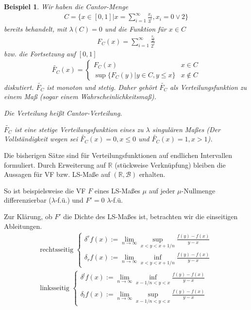 \documentclass[]{article}
\newtheorem*{example}{Beispiel}
\begin{document}
\begin{example}
	Wir haben die Cantor-Menge
	\begin{align*}
		C = \{ x \in [0,1] | x = \sum_{i=1}^{\infty} \frac{x_i}{3^i}, x_i = 0 \lor 2 \}
	\end{align*}
	bereits behandelt, mit $\lambda(C) = 0$ und die Funktion für $x \in C$
	\begin{align*}
		F_C(x) = \sum_{i=1}^{\infty} \frac{\frac{x_i}{2}}{2^i}
	\end{align*}
	bzw. die Fortsetzung auf $[0,1]$
	\begin{align*}
		\tilde{F_C}(x) = \begin{cases}
			F_C(x) & x \in C\\
			\sup \{F_C(y) | y \in C, y \leq x\} & x \notin C
		\end{cases}
	\end{align*}
	diskutiert. $\tilde{F_C}$ ist monoton und stetig. Daher gehört $\tilde{F_C}$ als Verteilungsfunktion zu einem Maß (sogar einem Wahrscheinlichkeitsmaß).
	
	Die Verteilung heißt Cantor-Verteilung.
	
	$\tilde{F_C}$ ist eine stetige Verteilungsfunktion eines zu $\lambda$ singulären Maßes (Der Vollständigkeit wegen sei $\tilde{F_C}(x) = 0, x \leq 0$ und $\tilde{F_C}(x) = 1, x > 1$).
\end{example}

Die bisherigen Sätze sind für Verteilungsfunktionen auf endlichen Intervallen formuliert. Durch Erweiterung auf $\mathbb{R}$ (stückweise Verknüpfung) bleiben die Aussagen für VF bzw. LS-Maße auf $(\mathbb{R}, \mathcal{B})$ erhalten.

So ist beispielsweise die VF $F$ eines LS-Maßes $\mu$ auf jeder $\mu$-Nullmenge differenzierbar ($\lambda$-f.ü.) und $F' = 0$ $\lambda$-f.ü.

Zur Klärung, ob $F'$ die Dichte des LS-Maßes ist, betrachten wir die einseitigen Ableitungen.
\begin{align*}
	\text{rechtsseitig } \begin{cases}
		\delta^r f(x) := \lim\limits_{n\rightarrow\infty} \sup_{x < y < x + 1/n} \frac{f(y)-f(x)}{y-x} \\
		\delta_r f(x) := \lim\limits_{n\rightarrow\infty} \inf_{x < y < x + 1/n} \frac{f(y)-f(x)}{y-x}
	\end{cases}\\
	\text{linksseitig } \begin{cases}
		\delta^l f(x) := \lim\limits_{n\rightarrow\infty} \inf_{x - 1/n < y < x} \frac{f(y)-f(x)}{y-x} \\
		\delta_l f(x) := \lim\limits_{n\rightarrow\infty} \sup_{x - 1/n < y < x} \frac{f(y)-f(x)}{y-x}
	\end{cases}
\end{align*}
\end{document}
